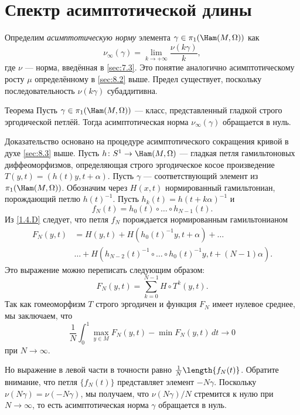 \section{Спектр асимптотической длины}\label{sec:11.2}

Определим \emph{асимптотическую норму} элемента
$\gamma\in\pi_1(\Ham(M, \Omega))$ как
\[\nu_\infty(\gamma)=\lim_{k\to+\infty}\frac{\nu(k\gamma)}{k},\]
где $\nu$ --- норма, введённая в \ref{sec:7.3}. 
Это понятие аналогично асимптотическому росту $\mu$ определённому в
\ref{sec:8.2} выше.
Предел существует, поскольку последовательность $\nu(k\gamma)$ субаддитивна.

\begin{thm}{Теорема}\label{11.2.A}
Пусть $\gamma\in\pi_1(\Ham(M,\Omega))$ --- класс, представленный
гладкой строго эргодической петлёй.
Тогда асимптотическая норма $\nu_\infty (\gamma)$ обращается в нуль.
\end{thm}

Доказательство основано на процедуре асимптотического сокращения
кривой в духе \ref{sec:8.3} выше. 
Пусть $h\: S^1 \to \Ham(M,\Omega)$ --- гладкая петля гамильтоновых
диффеоморфизмов, определяющая строго эргодическое косое произведение
$T(y, t) = (h(t)y, t+\alpha)$. 
Пусть $\gamma$ --- соответствующий элемент из $\pi_1(\Ham(M, \Omega))$.
Обозначим через $H(x, t)$ нормированный гамильтониан, порождающий
петлю $h(t)^{-1}$. 
Пусть $h_k(t) = h(t + k\alpha)^{-1}$ и  
\[f_N(t) = h_0(t) \circ \dots \circ h_{N-1}(t).\]
Из \ref{1.4.D} следует, что петля $f_N$ порождается нормированным гамильтонианом 
\begin{align*}
F_N(y,t)
&=
H(y,t)
+ H(h_0(t)^{-1}y,t+\alpha)
+\dots
\\
&\dots
+
H(h_{N-2} (t)^{-1} \circ \dots\circ h_0(t)^{-1}y, t + (N - 1)\alpha).
\end{align*}
Это выражение можно переписать следующим образом:
\[F_N(y, t) = \sum_{k=0}^{N-1} H\circ T^k(y, t).\]
Так как гомеоморфизм $T$ строго эргодичен и функция $F_N$ имеет
нулевое среднее, мы заключаем, что
\[\frac1N\int_0^1\max_{y\in M}F_N(y, t) - \min F_N(y, t)\,dt \to 0\]
при $N \to \infty$.

Но выражение в левой части в точности равно $\frac1N\length\{f_N(t)\}$.
Обратите внимание, что петля $\{f_N(t)\}$ представляет элемент $-N\gamma$.
Поскольку $\nu(N\gamma) = \nu(-N\gamma)$, мы получаем, что
$\nu(N\gamma)/N$ стремится к нулю при $N \to \infty$, 
то есть асимптотическая норма $\gamma$ обращается в нуль.
\qeds
{}

